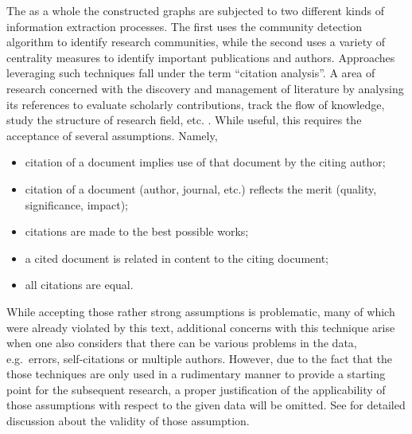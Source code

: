 \documentclass[11pt,a4paper]{book}
\theoremstyle{definition}
\theoremstyle{definition}
\theoremstyle{definition}
\theoremstyle{remark}
\begin{document}
The as a whole the constructed graphs are subjected to two different kinds of information extraction processes. The first uses the community detection algorithm to identify research communities, while the second uses a variety of centrality measures to identify important publications and authors. 
Approaches leveraging such techniques fall under the term ``citation analysis''. A area of research concerned with the discovery and management of literature by analysing its references to evaluate scholarly contributions, track the flow of knowledge, study the structure of research field, etc. \parencite[p.~1-5]{zhao2015analysis}. While useful, this requires the acceptance of several assumptions. Namely,
\begin{itemize}
\item citation of a document implies use of that document by the citing author;
\item citation of a document (author, journal, etc.) reflects the merit (quality, significance, impact);
\item citations are made to the best possible works;
\item a cited document is related in content to the citing document;
\item all citations are equal.
\end{itemize}
While accepting those rather strong assumptions is problematic, many of which were already violated by this text, additional concerns with this technique arise when one also considers that there can be various problems in the data, e.g.\ errors, self-citations or multiple authors. However, due to the fact that the those techniques are only used in a rudimentary manner to provide a starting point for the subsequent research, a proper justification of the applicability of those assumptions with respect to the given data will be omitted. See \parencite{smith1981citation} for detailed discussion about the validity of those assumption.
\end{document}
